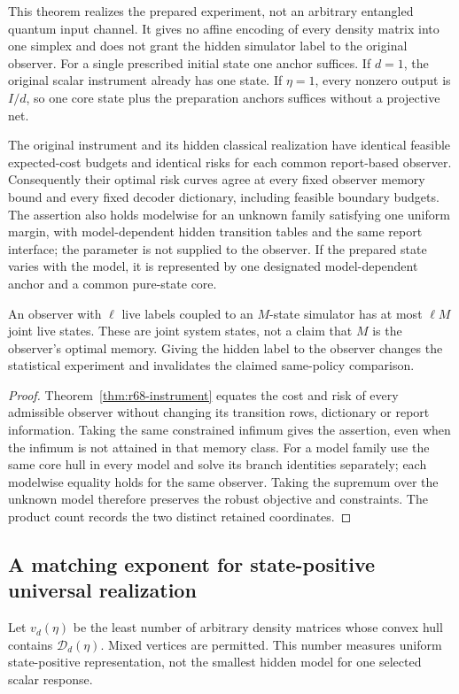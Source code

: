 This theorem realizes the prepared experiment, not an arbitrary entangled quantum input channel. It gives no affine encoding of every density matrix into one simplex and does not grant the hidden simulator label to the original observer. For a single prescribed initial state one anchor suffices. If $d=1$, the original scalar instrument already has one state. If $\eta=1$, every nonzero output is $I/d$, so one core state plus the preparation anchors suffices without a projective net.

\begin{corollary}\label{cor:r68-risk}
The original instrument and its hidden classical realization have identical feasible expected-cost budgets and identical risks for each common report-based observer. Consequently their optimal risk curves agree at every fixed observer memory bound and every fixed decoder dictionary, including feasible boundary budgets. The assertion also holds modelwise for an unknown family satisfying one uniform margin, with model-dependent hidden transition tables and the same report interface; the parameter is not supplied to the observer. If the prepared state varies with the model, it is represented by one designated model-dependent anchor and a common pure-state core.

An observer with $\ell$ live labels coupled to an $M$-state simulator has at most $\ell M$ joint live states. These are joint system states, not a claim that $M$ is the observer's optimal memory. Giving the hidden label to the observer changes the statistical experiment and invalidates the claimed same-policy comparison.
\end{corollary}
\begin{proof}
Theorem~\ref{thm:r68-instrument} equates the cost and risk of every admissible observer without changing its transition rows, dictionary or report information. Taking the same constrained infimum gives the assertion, even when the infimum is not attained in that memory class. For a model family use the same core hull in every model and solve its branch identities separately; each modelwise equality holds for the same observer. Taking the supremum over the unknown model therefore preserves the robust objective and constraints. The product count records the two distinct retained coordinates.
\end{proof}

\subsection{A matching exponent for state-positive universal realization}
Let $v_d(\eta)$ be the least number of arbitrary density matrices whose convex hull contains $\mathcal D_d(\eta)$. Mixed vertices are permitted. This number measures uniform state-positive representation, not the smallest hidden model for one selected scalar response.

